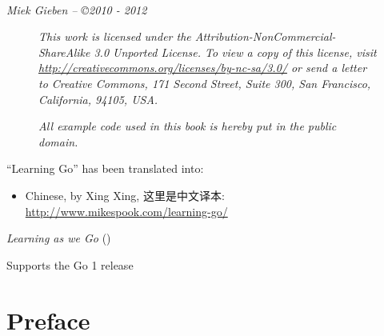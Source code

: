 \documentclass[a4paper,twoside,openleft]{blocksbook}
\begin{document}
\vfill
\begin{center}
    \hspace*{1cm}\\[2.5ex]
    \hspace*{1cm}{\tiny\CcNote{\CcLongnameByNcSa}}
\end{center}
\begin{center}
\hspace*{1cm}\emph{Miek Gieben -- \copyright 2010 - 2012}
\end{center}
\vspace{-3em}

\newpage

\thispagestyle{empty}
\begin{figure}[H]
\begin{center}
\emph{
This work is licensed under the Attribution-NonCommercial-ShareAlike 3.0 Unported License. To
view a copy of this license, visit \url{http://creativecommons.org/licenses/by-nc-sa/3.0/} 
or send a letter
to Creative Commons, 171 Second Street, Suite 300, San Francisco, California, 94105, USA.}
\vspace{2em}

\emph{All example code used in this book is hereby put in the public domain.}
\end{center}

\end{figure}

\begin{center}
``Learning Go'' has been translated into:
\begin{itemize}
\item Chinese, by Xing Xing, 这里是中文译本: {\url{http://www.mikespook.com/learning-go/}}
\end{itemize}
\end{center}

\begin{center}
\vfill
\emph{Learning as we Go}
(\emph{\version})

\tiny{Supports the Go 1 release}
\vspace{.2\stockheight}
\end{center}

\clearpage

\tableofcontents*
\listoffigures*
\listofcode* 
\listofex* 
\clearpage

\chapter*{Preface}
\label{chap:preface}

\end{document}
